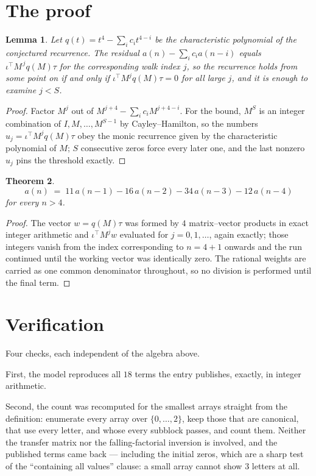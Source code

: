 \documentclass[11pt,a4paper]{article}
\theoremstyle{plain}
\newtheorem{theorem}{Theorem}
\newtheorem{lemma}[theorem]{Lemma}
\theoremstyle{definition}
\begin{document}
\section{The proof}

\begin{lemma}\label{lem:crit}
Let $q(t)=t^{4}-\sum_i c_it^{4-i}$ be the characteristic polynomial of the
conjectured recurrence. The residual $a(n)-\sum_ic_ia(n-i)$ equals
$\iota^{\!\top}M^{\,j}q(M)\tau$ for the corresponding walk index $j$, so the recurrence
holds from some point on if and only if $\iota^{\!\top}M^{j}q(M)\tau=0$ for all large $j$,
and it is enough to examine $j<S$.
\end{lemma}

\begin{proof}
Factor $M^{j}$ out of $M^{j+4}-\sum_ic_iM^{j+4-i}$. For the bound, $M^{S}$
is an integer combination of $I,M,\dots,M^{S-1}$ by Cayley--Hamilton, so the numbers
$u_j=\iota^{\!\top}M^{j}q(M)\tau$ obey the monic recurrence given by the characteristic
polynomial of $M$; $S$ consecutive zeros force every later one, and the last nonzero $u_j$
pins the threshold exactly.
\end{proof}

\begin{theorem}
\[
a(n)\;=\;11\,a(n-1) - 16\,a(n-2) - 34\,a(n-3) - 12\,a(n-4)
\]
for every $n>4$.
\end{theorem}

\begin{proof}
The vector $w=q(M)\tau$ was formed by $4$ matrix--vector products in exact integer
arithmetic and $\iota^{\!\top}M^{j}w$ evaluated for $j=0,1,\dots$, again exactly; those
integers vanish from the index corresponding to $n=4+1$ onwards and the run continued
until the working vector was identically zero. The rational weights are carried as one common
denominator throughout, so no division is performed until the final term.
\end{proof}

\section{Verification}

Four checks, each independent of the algebra above.

First, the model reproduces all $18$ terms the entry publishes, exactly, in integer
arithmetic.

Second, the count was recomputed for the smallest arrays straight from the definition:
enumerate every array over $\{0,\dots,2\}$, keep those that are canonical, that use every
letter, and whose every subblock passes, and count them. Neither the transfer matrix nor the
falling-factorial inversion is involved, and the published terms came back --- including the
initial zeros, which are a sharp test of the ``containing all values'' clause: a small array
cannot show $3$ letters at all.
\end{document}
